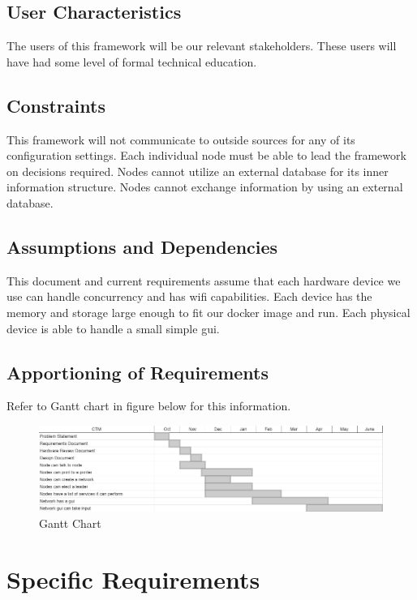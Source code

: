 \documentclass[draftclsnofoot, onecolumn, compsoc, 10pt]{IEEEtran}
\begin{document}
\subsection{User Characteristics} 
The users of this framework will be our relevant stakeholders. These users will have had some level of formal technical education.

\subsection{Constraints}
This framework will not communicate to outside sources for any of its configuration settings. Each individual node must be able to lead the framework on decisions required. Nodes cannot utilize an external database for its inner information structure. Nodes cannot exchange information by using an external database.

\subsection{Assumptions and Dependencies}
This document and current requirements assume that each hardware device we use can handle concurrency and has wifi capabilities. Each device has the memory and storage large enough to fit our docker image and run. Each physical device is able to handle a small simple gui.

\subsection{Apportioning of Requirements}
Refer to Gantt chart in figure below for this information.
\begin{landscape}
	\begin{figure}[!htb]
		\caption{Gantt Chart}
		\centering
			\includegraphics[scale=.7]{chart}
	\end{figure}
\end{landscape}
\FloatBarrier

\section{Specific Requirements}
\end{document}
